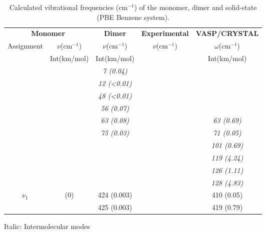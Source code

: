  				
 				\begin{table}[H]
 					\caption{ Calculated vibrational frequencies (cm$^{-1}$) of the monomer, dimer and solid-state (PBE Benzene system).}  \label{table-freqBen}
 					\begin{center}
 						\begin{threeparttable}
 						\begin{tabular}{c c c c c}
 							\toprule
 							\multicolumn{2}{p{4.5cm}}{\centering \textbf{Monomer}} & \textbf{Dimer} & \multicolumn{1}{p{4cm}}{\centering \textbf{Experimental}} & \textbf{VASP/CRYSTAL}\\
 							Assignment & $\nu$(cm$^{-1}$) & $\nu$(cm$^{-1}$) & $\nu$(cm$^{-1}$) & $\omega$(cm$^{-1}$) \\
 							& Int(km/mol) & Int(km/mol) & & Int(km/mol) \\
 							\midrule
 							&  &  \textit{7 (0.04)}& & \\
 							&  & \textit{12 (<0.01)} &  & \\
 							&  & \textit{48 (<0.01)}&  & \\
 							& & \textit{56 (0.07)} &  & \\
 							&  & \textit{63 (0.08)}&  & \textit{63 (0.69)} \\
 							&  & \textit{75 (0.03)} &  & \textit{71 (0.05)} \\
 							&   &  &    &  \textit{101 (0.69)}\\
 							&   & &  & \textit{119 (4.24)}\\
 							&   &   &   &  \textit{126 (1.11)}\\
 							&   &   &   & \textit{128 (4.83)}\\
 							\multirow{2}{2cm}{\centering $\nu_{1}$}& \multirow{2}{2cm}{\centering 426 (0)} & 424 (0.003) &   & 410 (0.05)\\
 							&   &   425 (0.003) &  & 419 (0.79)\\ 
 							\bottomrule	    
 						\end{tabular}
 						
 						\begin{tablenotes}
 							\item[] Italic: Intermolecular modes
 						\end{tablenotes}
 					\end{threeparttable}
 					\end{center}
 				\end{table}	
 				
 	
 	
